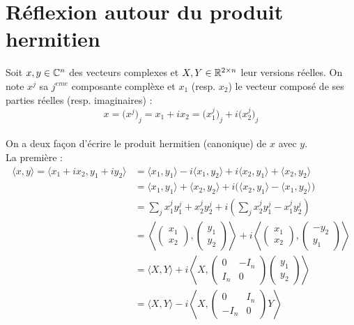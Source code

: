 \section{Réflexion autour du produit hermitien}


Soit $x,y\in\mathbb{C}^n$ des vecteurs complexes et $X,Y\in\mathbb{R}^{2\times n}$ leur versions réelles. On note $x^j$ sa $j^{eme}$ composante complèxe et $x_1$ (resp. $x_2$) le vecteur composé de ses parties réelles (resp. imaginaires) :
\[x = \big(x^j\big)_j =  x_1 + ix_2 =  \big(x^j_1\big)_j +i \big(x^j_2\big)_j\]
\\
On a deux façon d'écrire le produit hermitien (canonique) de $x$ avec $y$.
\\
La première :
\begin{align*}
	\langle x,y \rangle = \langle x_1 + ix_2, y_1 + iy_2\rangle &= \langle x_1, y_1\rangle - i \langle x_1,y_2\rangle +i\langle x_2, y_1\rangle + \langle x_2, y_2\rangle  \\
	&= \langle x_1, y_1\rangle + \langle x_2, y_2\rangle 
	+ i\big(\langle x_2, y_1\rangle - \langle x_1,y_2\rangle\big) \\
	&= \sum_j x^j_1 y^j_1+ x^j_2 y^j_2
	+ i\left(\sum_j x^j_2 y^j_1 -  x^j_1y^j_2\right) \\
	&= \left\langle \begin{pmatrix} x_1 \\ x_2 \end{pmatrix},\begin{pmatrix} y_1 \\ y_2 \end{pmatrix}\right\rangle
	+ i\left\langle \begin{pmatrix} x_1 \\ x_2 \end{pmatrix},\begin{pmatrix} -y_2 \\ y_1 \end{pmatrix}\right\rangle \\
	&= \Big\langle X,Y\Big\rangle 
	+ i\left\langle X,\begin{pmatrix} 0 & -I_n \\ I_n & 0 \end{pmatrix}\begin{pmatrix} y_1 \\ y_2 \end{pmatrix}\right\rangle\\
	&= \Big\langle X,Y\Big\rangle 
	- i\left\langle X,\begin{pmatrix} 0 & I_n \\ -I_n & 0 \end{pmatrix}Y\right\rangle
\end{align*}
